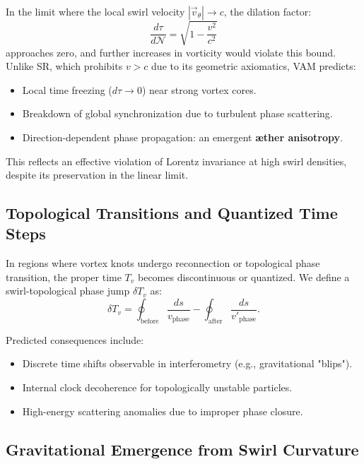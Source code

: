 \documentclass[11pt]{article}
\begin{document}
    In the limit where the local swirl velocity \( |\vec{v}_\theta| \rightarrow c \), the dilation factor:
    \[
        \frac{d\tau}{d\mathcal{N}} = \sqrt{1 - \frac{v^2}{c^2}}
    \]
    approaches zero, and further increases in vorticity would violate this bound. Unlike SR, which prohibits \( v > c \) due to its geometric axiomatics, VAM predicts:

    \begin{itemize}
        \item Local time freezing (\( d\tau \to 0 \)) near strong vortex cores.
        \item Breakdown of global synchronization due to turbulent phase scattering.
        \item Direction-dependent phase propagation: an emergent \textbf{æther anisotropy}.
    \end{itemize}

    This reflects an effective violation of Lorentz invariance at high swirl densities, despite its preservation in the linear limit.

    \subsection{Topological Transitions and Quantized Time Steps}

    In regions where vortex knots undergo reconnection or topological phase transition, the proper time \( T_v \) becomes discontinuous or quantized. We define a swirl-topological phase jump \( \delta T_v \) as:
    \[
        \delta T_v = \oint_{\text{before}} \frac{ds}{v_\text{phase}} - \oint_{\text{after}} \frac{ds}{v'_\text{phase}}.
    \]

    Predicted consequences include:
    \begin{itemize}
        \item Discrete time shifts observable in interferometry (e.g., gravitational "blips").
        \item Internal clock decoherence for topologically unstable particles.
        \item High-energy scattering anomalies due to improper phase closure.
    \end{itemize}

    \subsection{Gravitational Emergence from Swirl Curvature}
\end{document}
